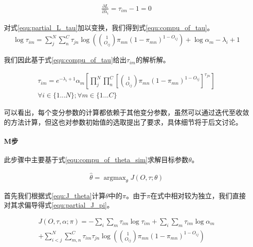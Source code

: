 \begin{equation}\label{equ:partial_L_lambda}
  \begin{aligned}
\frac{\partial L}{\partial \lambda_i}=\tau_{im}-1=0
\end{aligned}\end{equation}

对式\ref{equ:partial_L_tau}加以变换，我们得到式\ref{equ:compu_of_tau}。
\begin{equation}\label{equ:compu_of_tau}
  \begin{aligned}
\log \tau_{im} =\sum_{j}^N\sum_{n}^C\tau_{jn}\log ( \binom{1}{O_{ij}}\pi_{mn}(1-\pi_{mn})^{1-O_{ij}})+\log \alpha_m -\lambda_i+1
\end{aligned}\end{equation}

我们因此基于式\ref{equ:compu_of_tau}给出$\tau_{im}$的解析解。

\begin{equation}\label{equ:solution_of_tau}
  \begin{aligned}
\tau_{im} = e^{-\lambda_i+1}\alpha_m[\prod_j^N\prod_n^C[ \binom{1}{O_{ij}}\pi_{mn}(1-\pi_{mn})^{1-O_{ij}}]^{\tau_{jn}}]\\
\forall i \in \{1 ...N\} ;\forall m \in \{1 ... C\}
\end{aligned}\end{equation}

可以看出，每个变分参数的计算都依赖于其他变分参数，虽然可以通过迭代至收敛的方法计算，但这也对参数初始值的选取提出了要求，具体细节将于后文讨论。

\paragraph*{M步}此步骤中主要基于式\ref{equ:compu_of_theta_sim}求解目标参数$\theta$。

\begin{equation}\label{equ:compu_of_theta_sim}
  \begin{aligned}
\hat{\theta}=\mathop{\arg\max}_\theta J(O,\tau;\theta)
\end{aligned}\end{equation}

首先我们根据式\ref{equ:J_theta}计算$\theta$中的$\pi$。由于$\pi$在式中相对较为独立，我们直接对其求偏导得式\ref{equ:partial_J_pi}。

\begin{equation}\label{equ:J_theta}
  \begin{aligned}
J(O,\tau,\alpha;\pi)=-\sum_i\sum_m\tau_{im} \log \tau_{im} +\sum_i\sum_m \tau_{im} \log \alpha_m\\ +\sum_{i<j}^N\sum_{m,n}^C\tau_{im}\tau_{jn}\log ( \binom{1}{O_{ij}}\pi_{mn}(1-\pi_{mn})^{1-O_{ij}})
\end{aligned}\end{equation}

